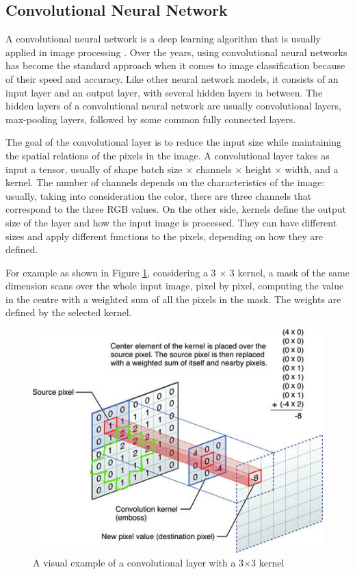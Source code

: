 \documentclass{usiinftr}
\begin{document}
\subsection{Convolutional Neural Network} 
A convolutional neural network is a deep learning algorithm that is usually applied in image processing \cite{13}.
Over the years, using convolutional neural networks has become the standard approach when it comes to image classification because of their speed and accuracy.
Like other neural network models, it consists of an input layer and an output layer, with several hidden layers in between.
The hidden layers of a convolutional neural network are usually convolutional layers, max-pooling layers, followed by some common fully connected layers.

The goal of the convolutional layer is to reduce the input size while maintaining the spatial relations of the pixels in the image. A convolutional layer takes as input a tensor, usually of shape batch size $\times$ channels $\times$ height $\times$ width, and a kernel. The number of channels depends on the characteristics of the image: usually, taking into consideration the color, there are three channels that correspond to the three RGB values. 
On the other side, kernels define the output size of the layer and how the input image is processed. They can have different sizes and apply different functions to the pixels, depending on how they are defined.

For example as shown in Figure \ref{fig:13}, considering a 3 $\times$ 3 kernel, a mask of the same dimension scans over the whole input image, pixel by pixel, computing the value in the centre with a weighted sum of all the pixels in the mask. The weights are defined by the selected kernel.

\begin{figure}[H]
	\centering
	\includegraphics[width=0.5\linewidth]{img/kernel}
	\caption{A visual example of a convolutional layer with a 3$\times$3 kernel \cite{14}}
	\label{fig:13}
\end{figure}
\end{document}
